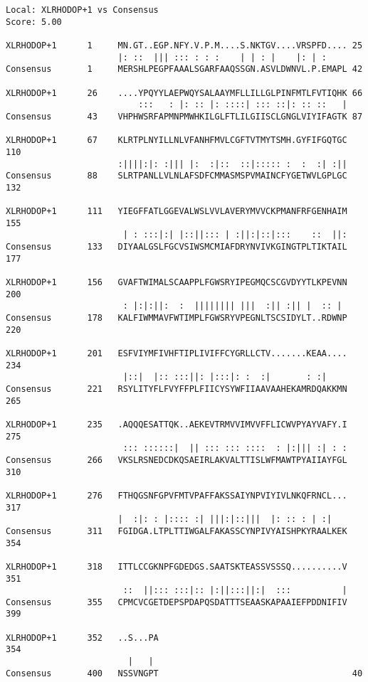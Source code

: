 \documentclass[12pt]{report}
\begin{document}
\unix{}
\begin{verbatim}
Local: XLRHODOP+1 vs Consensus
Score: 5.00

XLRHODOP+1      1     MN.GT..EGP.NFY.V.P.M....S.NKTGV....VRSPFD.... 25   
                      |: ::  ||| ::: : : :    | | : |    |: | :    
Consensus       1     MERSHLPEGPFAAALSGARFAAQSSGN.ASVLDWNVL.P.EMAPL 42   

XLRHODOP+1      26    ....YPQYYLAEPWQYSALAAYMFLLILLGLPINFMTLFVTIQHK 66   
                          :::   : |: :: |: ::::| ::: ::|: :: ::   |
Consensus       43    VHPHWSRFAPMNPMWHKILGLFTLILGIISCLGNGLVIYIFAGTK 87   

XLRHODOP+1      67    KLRTPLNYILLNLVFANHFMVLCGFTVTMYTSMH.GYFIFGQTGC 110  
                      :||||:|: :||| |:  :|::  ::|::::: :  :  :| :||
Consensus       88    SLRTPANLLVLNLAFSDFCMMASMSPVMAINCFYGETWVLGPLGC 132  

XLRHODOP+1      111   YIEGFFATLGGEVALWSLVVLAVERYMVVCKPMANFRFGENHAIM 155  
                       | : :::|:| |::||::: | :||:|::|:::    ::  ||:
Consensus       133   DIYAALGSLFGCVSIWSMCMIAFDRYNVIVKGINGTPLTIKTAIL 177  

XLRHODOP+1      156   GVAFTWIMALSCAAPPLFGWSRYIPEGMQCSCGVDYYTLKPEVNN 200  
                       : |:|:||:  :  |||||||| |||  :|| :|| |  :: | 
Consensus       178   KALFIWMMAVFWTIMPLFGWSRYVPEGNLTSCSIDYLT..RDWNP 220  

XLRHODOP+1      201   ESFVIYMFIVHFTIPLIVIFFCYGRLLCTV.......KEAA.... 234  
                       |::|  |:: :::||: |:::|: :  :|       : :|    
Consensus       221   RSYLITYFLFVYFFPLFIICYSYWFIIAAVAAHEKAMRDQAKKMN 265  

XLRHODOP+1      235   .AQQQESATTQK..AEKEVTRMVVIMVVFFLICWVPYAYVAFY.I 275  
                       ::: ::::::|  || ::: ::: ::::  : |:||| :| : :
Consensus       266   VKSLRSNEDCDKQSAEIRLAKVALTTISLWFMAWTPYAIIAYFGL 310  

XLRHODOP+1      276   FTHQGSNFGPVFMTVPAFFAKSSAIYNPVIYIVLNKQFRNCL... 317  
                      |  :|: : |:::: :| |||:|::|||  |: :: : | :|   
Consensus       311   FGIDGA.LTPLTTIWGALFAKASSCYNPIVYAISHPKYRAALKEK 354  

XLRHODOP+1      318   ITTLCCGKNPFGDEDGS.SAATSKTEASSVSSSQ..........V 351  
                       ::  ||::: :::|:: |:||:::||:|  :::          |
Consensus       355   CPMCVCGETDEPSPDAPQSDATTTSEAASKAPAAIEFPDDNIFIV 399  

XLRHODOP+1      352   ..S...PA                                      354  
                        |   | 
Consensus       400   NSSVNGPT                                      40
\end{verbatim}  
\end{document}
